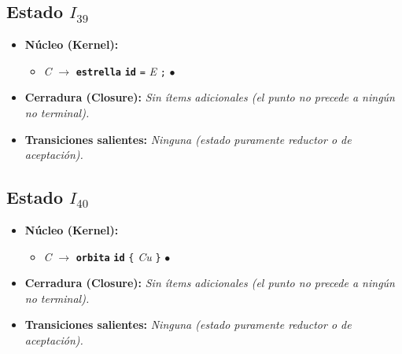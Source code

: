 \documentclass[12pt, letterpaper]{article}
\begin{document}
\subsection*{Estado $I_{39}$ }
\begin{itemize}\setlength{\itemsep}{1pt}\setlength{\parskip}{0pt}
\item \textbf{Núcleo (Kernel):}
\begin{itemize}\setlength{\itemsep}{1pt}\setlength{\parskip}{0pt}
    \item \textit{C} $\to$ \textbf{\texttt{estrella}} \textbf{\texttt{id}} \texttt{=} \textit{E} \texttt{;} $\bullet$ 
\end{itemize}
\item \textbf{Cerradura (Closure):} \emph{Sin ítems adicionales (el punto no precede a ningún no terminal).}
\item \textbf{Transiciones salientes:} \emph{Ninguna (estado puramente reductor o de aceptación).}
\end{itemize}
\vspace{2pt}
\subsection*{Estado $I_{40}$ }
\begin{itemize}\setlength{\itemsep}{1pt}\setlength{\parskip}{0pt}
\item \textbf{Núcleo (Kernel):}
\begin{itemize}\setlength{\itemsep}{1pt}\setlength{\parskip}{0pt}
    \item \textit{C} $\to$ \textbf{\texttt{orbita}} \textbf{\texttt{id}} \texttt{\{} \textit{Cu} \texttt{\}} $\bullet$ 
\end{itemize}
\item \textbf{Cerradura (Closure):} \emph{Sin ítems adicionales (el punto no precede a ningún no terminal).}
\item \textbf{Transiciones salientes:} \emph{Ninguna (estado puramente reductor o de aceptación).}
\end{itemize}
\vspace{2pt}
\end{document}
